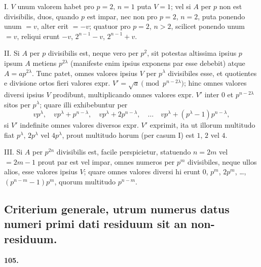 \documentclass[12pt,a4paper]{article}
\theoremstyle{plain}
\theoremstyle{definition}
\theoremstyle{remark}
\begin{document}
I. $V$ unum valorem habet pro $p=2$, $n=1$ puta $V=1$; vel si $A$ per $p$ non est divisibilis, duos, quando $p$ est impar, nec non pro $p=2$, $n=2$, puta ponendo unum $=v$, alter erit $=-v$; quatuor pro $p=2$, $n>2$, scilicet ponendo unum $=v$, reliqui erunt $-v$, $2^{n-1}-v$, $2^{n-1}+v$.

II. Si $A$ per $p$ divisibilis est, neque vero per $p^2$, sit potestas altissima ipsius $p$ ipsum $A$ metiens $p^{2\lambda}$ (manifeste enim ipsius exponens par esse debebit) atque $A=ap^{2\lambda}$. Tunc patet, omnes valores ipsius $V$ per $p^\lambda$ divisibiles esse, et quotientes e divisione ortos fieri valores expr. $V' = \sqrt{a} \pmod{p^{n-2\lambda}}$; hinc omnes valores diversi ipsius $V$ prodibunt, multiplicando omnes valores expr. $V'$ inter $0$ et $p^{n-2\lambda}$ sitos per $p^\lambda$; quare illi exhibebuntur per
\[vp^\lambda,\quad vp^\lambda + p^{n-\lambda},\quad vp^\lambda + 2p^{n-\lambda},\quad \ldots\quad vp^\lambda + (p^\lambda-1)p^{n-\lambda},\]
si $V'$ indefinite omnes valores diversos expr. $V'$ exprimit, ita ut illorum multitudo fiat $p^\lambda$, $2p^\lambda$ vel $4p^\lambda$, prout multitudo horum (per casum I) est $1$, $2$ vel $4$.

III. Si $A$ per $p^{2n}$ divisibilis est, facile perspicietur, statuendo $n=2m$ vel $=2m-1$ prout par est vel impar, omnes numeros per $p^m$ divisibiles, neque ullos alios, esse valores ipsius $V$; quare omnes valores diversi hi erunt $0$, $p^m$, $2p^m$, \ldots, $(p^{n-m}-1)p^m$, quorum multitudo $p^{n-m}$.

\subsection*{Criterium generale, utrum numerus datus numeri primi dati residuum sit an non-residuum.}

\setcounter{satz}{105}
\addtocounter{satz}{-1}
\textbf{105.}
\end{document}
